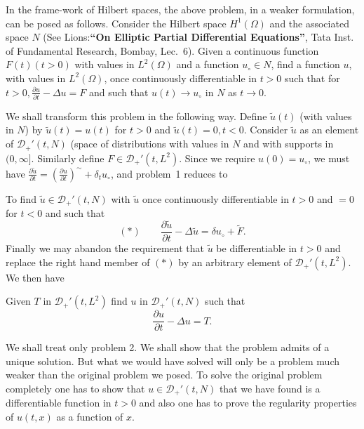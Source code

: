 In the frame-work of Hilbert spaces, the above problem, in a weaker
formulation, can be posed as follows. Consider the Hilbert space
$H^1(\Omega)$ and the associated space $N$ (See Lions:{\bf ``On  
Elliptic Partial Differential Equations''}, Tata Inst. of Fundamental
Research, Bombay, Lec.~6). 
 Given a continuous function $F(t) (t > 0)$
with values in $L^2 (\Omega)$ and a function $u_\circ \in N$, find a
function $u$, with values in $L^2(\Omega)$, once continuously
differentiable in $t > 0$ such that for $t > 0, \frac{\partial
  u}{\partial t}-\Delta u = F$ and such that $u(t) \to u_\circ$ in $N$
as $t \to 0$.

We shall transform this problem in the following way. Define
$\tilde{u}(t)$ (with values in $N$) by $\tilde{u}(t) = u(t)$ for $t >
0$ and $\tilde{u}(t) = 0, t < 0$. Consider $\tilde{u}$ as an element
of $\mathscr{D}_+'(t, N)$ (space of distributions with values in $N$
and with supports in $(0, \infty]$. Similarly define $F\in
\mathscr{D}_+'(t, L^2)$. Since we require $u(0)=u_\circ$, we must have
$\frac{\partial \tilde{u}}{\partial t}={\left( \frac{\partial
u}{\partial t}\right)}^\sim + \delta_t u_\circ$, and problem~1
reduces to 

 To find $\tilde{u} \in \mathscr{D}_+'
(t, N)$ with $\tilde{u}$ once continuously differentiable in $t > 0$
and $= 0$ for $t < 0$ and such that
$$
(*) \qquad \frac{\partial \tilde{u}}{\partial t}- \Delta \tilde{u} =
\delta u_\circ + \tilde{F}.
$$
Finally we may abandon the requirement that $\tilde{u}$ be
differentiable in $t > 0$ and replace the right hand member of $(*)$
by an arbitrary element of $\mathscr{D}_+' (t, L^2)$. We then have 

\pageoriginale Given $T$ in 
$\mathscr{D}_+'(t, L^2)$ find $u$ in $\mathscr{D}_+' (t, N)$ such that 
$$
\frac{\partial u}{\partial t}- \Delta u = T.
$$

We shall treat only problem 2. We shall show that the problem admits
of a unique solution. But what we would have solved will only be a
problem much weaker than the original problem we posed. To solve the
original problem completely one has to show that $u \in
\mathscr{D}_+'(t, N)$ that we have found is a differentiable function
in $t > 0$ and also one has to prove the regularity properties of
$u(t, x)$ as a function of $x$. 
